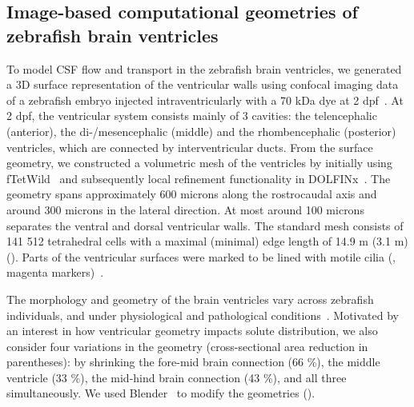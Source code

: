 \documentclass{WileyMSP-template}
\begin{document}
\subsection{Image-based computational geometries of zebrafish brain ventricles}
To model CSF flow and transport in the zebrafish brain ventricles, we
generated a 3D surface representation of the ventricular walls using
confocal imaging data of a zebrafish embryo injected
intraventricularly with a 70 kDa dye at 2
dpf~\cite{Olstad2019CiliaryDevelopment}. At 2 dpf, the ventricular
system consists mainly of 3 cavities: the telencephalic (anterior),
the di-/mesencephalic (middle) and the rhombencephalic (posterior)
ventricles, which are connected by interventricular ducts. From the
surface geometry, we constructed a volumetric mesh of the ventricles
by initially using fTetWild~\cite{Hu2020FastWild} and subsequently
local refinement functionality in DOLFINx~\cite{dolfinx2023preprint}. 
The geometry spans approximately 600 microns along the rostrocaudal axis
and around 300 microns in the lateral direction. At most around
100 microns separates the ventral and dorsal ventricular walls.
The standard mesh consists of 141 512 tetrahedral cells with a
maximal (minimal) edge length of 14.9 \textmu
m (3.1 \textmu m) (). Parts of the
ventricular surfaces were marked to be lined with motile cilia
(, magenta
markers)~\cite{Olstad2019CiliaryDevelopment}.

The morphology and geometry of the brain ventricles vary across zebrafish
individuals, and under physiological and pathological conditions~\cite{Olstad2019CiliaryDevelopment}. 
Motivated by an interest in how ventricular geometry impacts solute distribution,
we also consider four variations in the geometry (cross-sectional area
reduction in parentheses):
by shrinking the fore-mid brain connection (66 \%), 
the middle ventricle (33 \%), the mid-hind brain connection (43 \%), and all three simultaneously.
We used Blender~\cite{Community2018BlenderPackage} to modify the geometries ().
\end{document}
